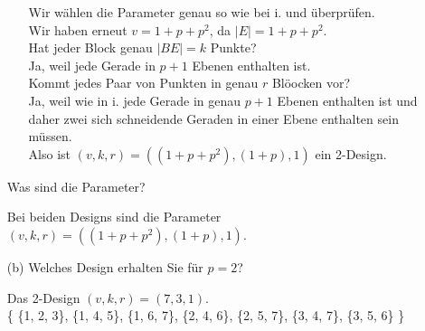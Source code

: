 \documentclass{article} %
\begin{document}
\begin{itemize}
\begin{itemize}
        \begin{mybox}
           Wir wählen die Parameter genau so wie bei i. und überprüfen. \\ \newline
            Wir haben erneut $v = 1 + p + p^2$, da $\mid E \mid = 1 + p + p^2$. \\ \newline
        Hat jeder Block genau $| BE |= k$ Punkte? \\
       Ja, weil jede Gerade in $p+1$ Ebenen enthalten ist.  \\  \newline
        Kommt jedes Paar von Punkten in genau $r$ Blöocken vor? \\
       Ja, weil wie in i. jede Gerade in genau $p+1$ Ebenen enthalten ist und daher zwei sich schneidende Geraden in einer Ebene enthalten sein müssen. \\
        Also ist $(v,k,r)=((1 + p + p^2), (1+p), 1)$ ein 2-Design.
        \end{mybox}
    \end{itemize}

    Was sind die Parameter?
    \begin{mybox}
    Bei beiden Designs sind die Parameter $(v,k,r)=((1 + p + p^2), (1+p), 1)$. 
    \end{mybox}
    
    \item[(b)] Welches Design erhalten Sie für \( p = 2 \)?
    \begin{mybox}
    Das 2-Design $(v,k,r)=(7, 3, 1)$.  \\
    \{ \{1, 2, 3\}, \{1, 4, 5\}, \{1, 6, 7\}, \{2, 4, 6\}, \{2, 5, 7\}, \{3, 4, 7\}, \{3, 5, 6\} \}
    \end{mybox}
\end{itemize}
\end{document}
